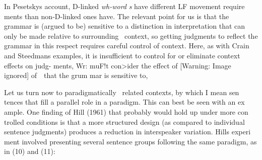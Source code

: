 \begin{styleStandard}
In Pesetsky{\textquotesingle}s account, D-linked \textit{wh-word}\textit{ }\textit{s}\textit{ }have different LF movement require\- ments than non-D-linked ones have. The relevant point for us is that the grammar is (argued to be) sensitive to a distinction in interpretation that can only be made relative to surrounding \ context, so getting judgments to reflect the grammar in this respect requires careful control of context. Here, as with Crain and Steedman{\textquotesingle}s examples, it is insufficient to control for or eliminate context effects on judg- ments, Wr: muF!t con{\textquotesingle}{\textgreater}ider the effect of   [Warning: Image ignored] %
  of\ \ that the grum mar is sensitive to,
\end{styleStandard}


\begin{styleStandard}
Let us turn now to paradigmatically \ related contexts, by which I mean sen\- tences that fill a parallel role in a paradigm. This can best be seen with an ex\- ample. One finding of Hill (1961) that probably would hold up under more con\- trolled conditions is that a more structured design (as compared to individual sentence judgments) produces a reduction in interspeaker variation. Hill{\textquotesingle}s experi\- ment involved presenting several sentence groups following the same paradigm, as in (10) and (11):
\end{styleStandard}


